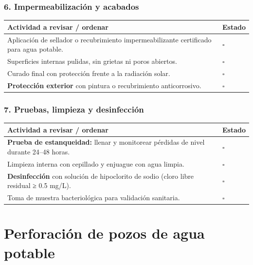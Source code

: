 \documentclass[12pt]{article}
\newcommand{\cbox}{\(\square\)} %
\begin{document}
	\subsubsection*{6. Impermeabilización y acabados}
	\begin{tabularx}{\linewidth}{>{\raggedright\arraybackslash}p{0.93\linewidth} >{\centering\arraybackslash}m{0.07\linewidth}}
		\toprule
		\textbf{Actividad a revisar / ordenar} & \textbf{Estado}\\
		\midrule
		Aplicación de sellador o recubrimiento impermeabilizante certificado para agua potable. & \cbox \\
		Superficies internas pulidas, sin grietas ni poros abiertos. & \cbox \\
		Curado final con protección frente a la radiación solar. & \cbox \\
		\textbf{Protección exterior} con pintura o recubrimiento anticorrosivo. & \cbox \\
		\bottomrule
	\end{tabularx}
	
	\subsubsection*{7. Pruebas, limpieza y desinfección}
	\begin{tabularx}{\linewidth}{>{\raggedright\arraybackslash}p{0.93\linewidth} >{\centering\arraybackslash}m{0.07\linewidth}}
		\toprule
		\textbf{Actividad a revisar / ordenar} & \textbf{Estado}\\
		\midrule
		\textbf{Prueba de estanqueidad:} llenar y monitorear pérdidas de nivel durante 24–48 horas. & \cbox \\
		Limpieza interna con cepillado y enjuague con agua limpia. & \cbox \\
		\textbf{Desinfección} con solución de hipoclorito de sodio (cloro libre residual ≥ 0.5 mg/L). & \cbox \\
		Toma de muestra bacteriológica para validación sanitaria. & \cbox \\
		\bottomrule
	\end{tabularx}
	
	
	
	
	
	
	
	
	\section{Perforación de pozos de agua potable}
	
\end{document}
